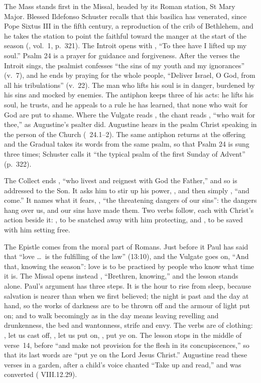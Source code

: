 The Mass stands first in the Missal, headed by its Roman station, St Mary
Major. Blessed Ildefonso Schuster recalls that this basilica has venerated,
since Pope Sixtus III in the fifth century, a reproduction of the crib of
Bethlehem, and he takes the station to point the faithful toward the manger
at the start of the season (, vol.~1, p.~321). The
Introit opens with , ``To thee have I lifted
up my soul.'' Psalm 24 is a prayer for
guidance and forgiveness. After the verses the Introit sings, the psalmist
confesses ``the sins of my youth and my ignorances'' (v.~7), and he ends by
praying for the whole people, ``Deliver Israel, O God, from all his
tribulations'' (v.~22). The man who lifts his soul is in danger, burdened by
his sins and mocked by enemies. The antiphon keeps three of his acts: he lifts
his soul, he trusts, and he appeals to a rule he has learned, that none who
wait for God are put to shame. Where the Vulgate reads , the chant reads , ``who wait for thee,'' as
Augustine's psalter did. Augustine hears in the psalm Christ speaking in the
person of the Church (~24.1--2). The same antiphon returns
at the offering and the Gradual takes its words from the same psalm, so that
Psalm 24 is sung three times; Schuster calls it ``the typical psalm of the
first Sunday of Advent'' (p.~322).

The Collect ends , ``who livest and
reignest with God the Father,'' and so is addressed to the Son. It asks him to
stir up his power,
, and then simply , ``and
come.'' It names what it fears, , ``the threatening dangers of our sins'': the dangers hang over
us, and our sins have made them. Two verbs follow, each with Christ's action
beside it: , to be snatched away with him
protecting, and , to be saved with him setting
free.

The Epistle comes from the moral part of Romans. Just before it Paul has
said that ``love \dots\ is the fulfilling of the law'' (13:10), and the
Vulgate goes on, ``And that, knowing the season'': love is to be practised by
people who know what time it is. The Missal opens instead , ``Brethren, knowing,'' and the lesson stands alone. Paul's argument
has three steps. It is the hour to rise from sleep, because salvation is
nearer than when we first believed; the night is past and the day at hand, so
the works of darkness are to be thrown off and the armour of light put on; and
to walk becomingly as in the day means leaving revelling and drunkenness, the
bed and wantonness, strife and envy. The verbs are of clothing:
, let us cast off, , let us put on,
, put ye on. The lesson stops in the middle of verse~14,
before ``and make not provision for the flesh in its concupiscences,'' so
that its last words are ``put ye on the Lord Jesus Christ.'' Augustine read
these verses in a garden, after a child's voice chanted ``Take up and read,''
and was converted ( VIII.12.29).

